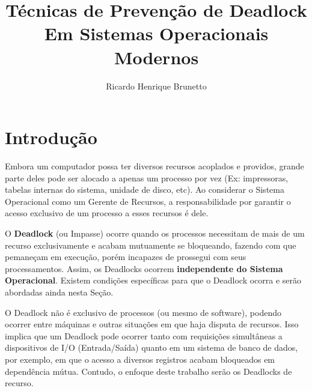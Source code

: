 

\sloppy

\title{Técnicas de Prevenção de Deadlock\\Em Sistemas Operacionais Modernos}

\author{Ricardo Henrique Brunetto}


\address{Departamento de Informática -- Universidade Estadual de Maringá (UEM)\\
	Maringá -- PR -- Brasil
}



	\maketitle

	{}

	\newpage
	\tableofcontents
	\newpage

  \section{Introdução}\label{sec:intro}
	Embora um computador possa ter diversos recursos acoplados e providos, grande parte deles pode ser alocado a apenas um processo por vez (Ex: impressoras, tabelas internas do sistema, unidade de disco, etc). Ao considerar o Sistema Operacional como um Gerente de Recursos, a responsabilidade por garantir o acesso exclusivo de um processo a esses recursos é dele.

	O \textbf{Deadlock} (ou Impasse) ocorre quando os processos necessitam de mais de um recurso exclusivamente e acabam mutuamente se bloqueando, fazendo com que pemaneçam em execução, porém incapazes de prossegui com seus processamentos. Assim, os Deadlocks ocorrem \textbf{independente do Sistema Operacional}. Existem condições específicas para que o Deadlock ocorra e serão abordadas ainda nesta Seção.

	O Deadlock não é exclusivo de processos (ou mesmo de software), podendo ocorrer entre máquinas e outras situações em que haja disputa de recursos. Isso implica que um Deadlock pode ocorrer tanto com requisições simultâneas a dispositivos de I/O (Entrada/Saída) quanto em um sistema de banco de dados, por exemplo, em que o acesso a diversos registros acabam bloqueados em dependência mútua. Contudo, o enfoque deste trabalho serão os Deadlocks de recurso.

